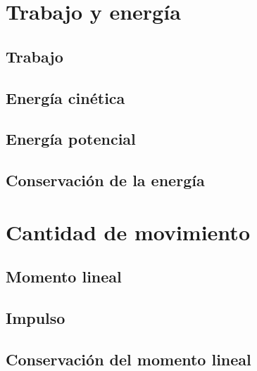 \documentclass[12pt,oneside]{book}
\begin{document}

\chapter{Trabajo y energía}

\section{Trabajo}

\section{Energía cinética}

\section{Energía potencial}

\section{Conservación de la energía}


\chapter{Cantidad de movimiento}

\section{Momento lineal}

\section{Impulso}

\section{Conservación del momento lineal}

\end{document}
